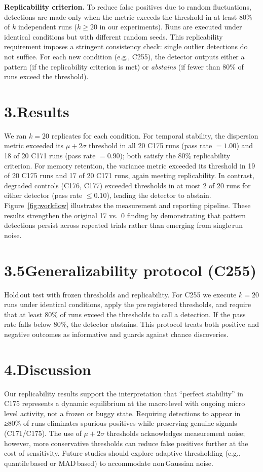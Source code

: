 \documentclass[11pt]{article}
\begin{document}
\smallskip
\noindent\textbf{Replicability criterion.}  To reduce false positives due to random fluctuations, detections are made only when the metric exceeds the threshold in at least 80\% of $k$ independent runs ($k\ge 20$ in our experiments).  Runs are executed under identical conditions but with different random seeds.  This replicability requirement imposes a stringent consistency check: single outlier detections do not suffice.  For each new condition (e.g., C255), the detector outputs either a pattern (if the replicability criterion is met) or \emph{abstains} (if fewer than 80\% of runs exceed the threshold).

\section*{3.\quad Results}
We ran $k=20$ replicates for each condition.  For temporal stability, the dispersion metric exceeded its $\mu+2\sigma$ threshold in all 20 C175 runs (pass rate $=1.00$) and 18 of 20 C171 runs (pass rate $=0.90$); both satisfy the 80\% replicability criterion.  For memory retention, the variance metric exceeded its threshold in 19 of 20 C175 runs and 17 of 20 C171 runs, again meeting replicability.  In contrast, degraded controls (C176, C177) exceeded thresholds in at most 2 of 20 runs for either detector (pass rate $\le0.10$), leading the detector to abstain.  Figure~\ref{fig:workflow} illustrates the measurement and reporting pipeline.  These results strengthen the original 17 vs.~0 finding by demonstrating that pattern detections persist across repeated trials rather than emerging from single\,run noise.

\section*{3.5\quad Generalizability protocol (C255)}
Hold\,out test with frozen thresholds and replicability.  For C255 we execute $k=20$ runs under identical conditions, apply the pre\,registered thresholds, and require that at least 80\% of runs exceed the thresholds to call a detection.  If the pass rate falls below 80\%, the detector abstains.  This protocol treats both positive and negative outcomes as informative and guards against chance discoveries.

\section*{4.\quad Discussion}
Our replicability results support the interpretation that ``perfect stability'' in C175 represents a dynamic equilibrium at the macro\,level with ongoing micro\,level activity, not a frozen or buggy state.  Requiring detections to appear in ≥80\% of runs eliminates spurious positives while preserving genuine signals (C171/C175).  The use of $\mu+2\sigma$ thresholds acknowledges measurement noise; however, more conservative thresholds can reduce false positives further at the cost of sensitivity.  Future studies should explore adaptive thresholding (e.g., quantile\,based or MAD\,based) to accommodate non\,Gaussian noise.
\end{document}

